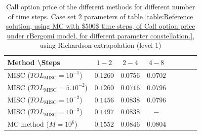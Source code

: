 \begin{table}[!h]
	\centering
	\begin{tabular}{l*{6}{c}r}
		Method \textbackslash  Steps    &$1-2$         & $2-4$ & $4-8$ \\
		\hline
		MISC ($TOL_{\text{MISC}}=10^{-1}$)  &$0.1260$ & $0.0756$ & $0.0702$   \\
		MISC ($TOL_{\text{MISC}}=5.10^{-2}$)   &$0.1260$ & $0.0716$ & $0.0796$    \\
		MISC ($TOL_{\text{MISC}}=10^{-2}$)  &$0.1456$ & $0.0838$ & $0.0796$  \\	
		MISC ($TOL_{\text{MISC}}=10^{-3}$)  &$0.1497$ & $0.0838$ & $-$ \\
		
		\hline
		MC method ($M=10^{6}$)   & $0.1552 $  & $0.0846 $  & $0.0804$  \\		
		\hline
	\end{tabular}
	\caption{Call option price of the different methods for different number of time steps. Case set $2$ parameters of table \ref{table:Reference solution, using MC with $500$ time steps, of Call option price under rBergomi model, for different parameter constellation.}, using Richardson extrapolation (level $1$)}
	\label{table:  Call option price of the different methods for different number of time steps. Case set $2$ parameter, using Richardson extrapolation (level $1$),linear}
\end{table}

\FloatBarrier

